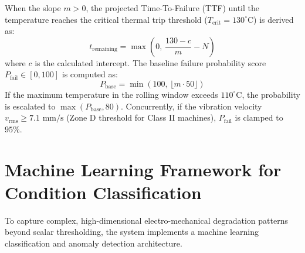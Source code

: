 \documentclass[12pt,a4paper,oneside]{report}
\begin{document}
When the slope $m > 0$, the projected Time-To-Failure (TTF) until the temperature reaches the critical thermal trip threshold ($T_{\text{crit}} = 130^\circ\text{C}$) is derived as:
\begin{equation}
    t_{\text{remaining}} = \max\left(0, \, \frac{130 - c}{m} - N\right)
\end{equation}
where $c$ is the calculated intercept. The baseline failure probability score $P_{\text{fail}} \in [0, 100]$ is computed as:
\begin{equation}
    P_{\text{base}} = \min(100, \, \lfloor m \cdot 50 \rfloor)
\end{equation}
If the maximum temperature in the rolling window exceeds $110^\circ\text{C}$, the probability is escalated to $\max(P_{\text{base}}, 80)$. Concurrently, if the vibration velocity $v_{\text{rms}} \ge 7.1\text{ mm/s}$ (Zone D threshold for Class II machines), $P_{\text{fail}}$ is clamped to $95\%$.

\section{Machine Learning Framework for Condition Classification}
To capture complex, high-dimensional electro-mechanical degradation patterns beyond scalar thresholding, the system implements a machine learning classification and anomaly detection architecture.
\end{document}
